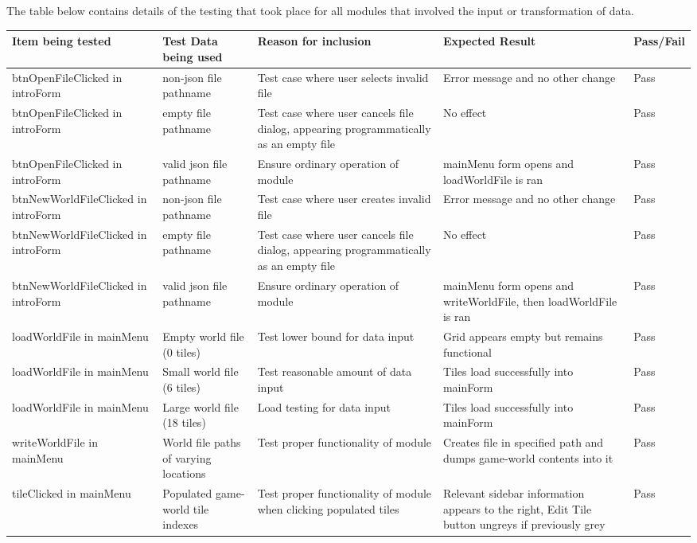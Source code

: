\documentclass{article} \usepackage[margin=1in,headheight=57pt,headsep=0.1in]{geometry}
\begin{document}
The table below contains details of the testing that took place for all modules that involved the input or transformation of data. \\
\begin{center}
	\begin{longtable}[H]{|p{2.9cm}|p{2.9cm}|p{2.9cm}|p{2.9cm}|p{2.9cm}|} \hline
		Item being tested & Test Data being used & Reason for inclusion & Expected Result & Pass/Fail \\ \hline
		btnOpenFileClicked in introForm & non-json file pathname & Test case where user selects invalid file & Error message and no other change & Pass \\ \hline
		btnOpenFileClicked in introForm & empty file pathname & Test case where user cancels file dialog, appearing programmatically as an empty file & No effect & Pass \\ \hline
		btnOpenFileClicked in introForm & valid json file pathname & Ensure ordinary operation of module & mainMenu form opens and loadWorldFile is ran & Pass \\ \hline
		btnNewWorldFileClicked in introForm & non-json file pathname & Test case where user creates invalid file & Error message and no other change & Pass \\ \hline
		btnNewWorldFileClicked in introForm & empty file pathname & Test case where user cancels file dialog, appearing programmatically as an empty file & No effect & Pass \\ \hline
		btnNewWorldFileClicked in introForm & valid json file pathname & Ensure ordinary operation of module & mainMenu form opens and writeWorldFile, then loadWorldFile is ran & Pass \\ \hline
		loadWorldFile in mainMenu & Empty world file (0 tiles) & Test lower bound for data input & Grid appears empty but remains functional & Pass \\ \hline
		loadWorldFile in mainMenu & Small world file (6 tiles) & Test reasonable amount of data input & Tiles load successfully into mainForm & Pass \\ \hline
		loadWorldFile in mainMenu & Large world file (18 tiles) & Load testing for data input & Tiles load successfully into mainForm & Pass \\ \hline
		writeWorldFile in mainMenu & World file paths of varying locations & Test proper functionality of module & Creates file in specified path and dumps game-world contents into it & Pass \\ \hline
		tileClicked in mainMenu & Populated game-world tile indexes & Test proper functionality of module when clicking populated tiles & Relevant sidebar information appears to the right, Edit Tile button ungreys if previously grey & Pass \\ \hline

\end{longtable}
\end{center}
\end{document}
